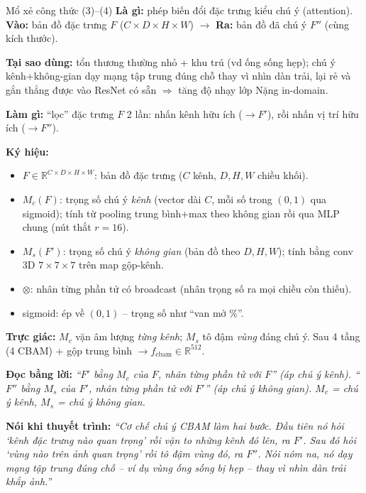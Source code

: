 \documentclass[12pt,a4paper]{article}
\begin{document}
\begin{ctbox}{Mổ xẻ công thức (3)--(4)}
\textbf{Là gì:} phép biến đổi đặc trưng kiểu chú ý (attention). \quad\textbf{Vào:} bản đồ đặc trưng $F$ ($C{\times}D{\times}H{\times}W$) $\to$ \textbf{Ra:} bản đồ đã chú ý $F''$ (cùng kích thước).

\textbf{Tại sao dùng:} tổn thương thường nhỏ + khu trú (vd ống sống hẹp); chú ý kênh+không-gian dạy mạng tập trung đúng chỗ thay vì nhìn dàn trải, lại rẻ và gắn thẳng được vào ResNet có sẵn $\Rightarrow$ tăng độ nhạy lớp Nặng in-domain.

\textbf{Làm gì:} ``lọc'' đặc trưng $F$ 2 lần: nhấn kênh hữu ích ($\to F'$), rồi nhấn vị trí hữu ích ($\to F''$).

\textbf{Ký hiệu:}
\begin{itemize}[leftmargin=1.4em,itemsep=1pt]
\item $F\in\mathbb{R}^{C\times D\times H\times W}$: bản đồ đặc trưng ($C$ kênh, $D,H,W$ chiều khối).
\item $M_c(F)$: trọng số chú ý \emph{kênh} (vector dài $C$, mỗi số trong $(0,1)$ qua sigmoid); tính từ pooling trung bình+max theo không gian rồi qua MLP chung (nút thắt $r=16$).
\item $M_s(F')$: trọng số chú ý \emph{không gian} (bản đồ theo $D,H,W$); tính bằng conv 3D $7\times7\times7$ trên map gộp-kênh.
\item $\otimes$: nhân từng phần tử có broadcast (nhân trọng số ra mọi chiều còn thiếu).
\item sigmoid: ép về $(0,1)$ -- trọng số như ``van mở \%''.
\end{itemize}
\textbf{Trực giác:} $M_c$ vặn âm lượng \emph{từng kênh}; $M_s$ tô đậm \emph{vùng} đáng chú ý. Sau 4 tầng (4 CBAM) + gộp trung bình $\to f_{\text{cbam}}\in\mathbb{R}^{512}$.

\textbf{Đọc bằng lời:} \emph{``$F'$ bằng $M_c$ của $F$, nhân từng phần tử với $F$'' (áp chú ý kênh). ``$F''$ bằng $M_s$ của $F'$, nhân từng phần tử với $F'$'' (áp chú ý không gian). $M_c$ = chú ý kênh, $M_s$ = chú ý không gian.}

\textbf{Nói khi thuyết trình:} \emph{``Cơ chế chú ý CBAM làm hai bước. Đầu tiên nó hỏi `kênh đặc trưng nào quan trọng' rồi vặn to những kênh đó lên, ra $F'$. Sau đó hỏi `vùng nào trên ảnh quan trọng' rồi tô đậm vùng đó, ra $F''$. Nói nôm na, nó dạy mạng tập trung đúng chỗ -- ví dụ vùng ống sống bị hẹp -- thay vì nhìn dàn trải khắp ảnh.''}
\end{ctbox}
\end{document}
